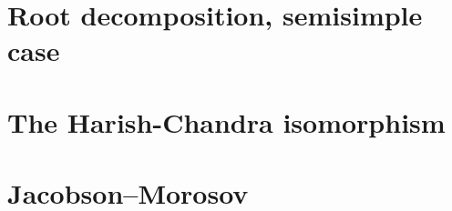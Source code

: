 \section{Root decomposition, semisimple case}






\section{The Harish-Chandra isomorphism}


\section{Jacobson--Morosov}












